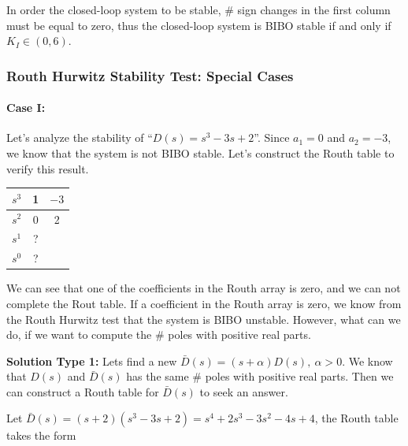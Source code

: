 \documentclass[twoside]{article}
\begin{document}
In order the closed-loop system to be stable, $\#$ sign changes in the
first column must be equal to zero, thus the closed-loop system is BIBO stable
if and only if $K_I \in (0 , 6)$.

\subsubsection{Routh Hurwitz Stability Test: Special Cases}

\paragraph{Case I:}

Let's analyze the stability of ``$D(s) = s^3 - 3 s + 2$''. 
Since $a_1 = 0$ and $a_2 = -3$, we know that the system
is not BIBO stable. Let's construct the Routh table to verify this result.

 \begin{minipage}[h]{1\linewidth}
\begin{center}
\begin{tabular}{|c || c || c  |}
\hline
$s^3$ & 1 & $-3$ 
\\ \hline
$s^2$ & 0 & 2
\\ \hline
$s^1$  & ? & 
\\ \hline
$s^0$  & ? & 
\\ \hline
\end{tabular}
\end{center}
  \end{minipage}

We can see that one of the coefficients in the Routh array is zero,
and we can not complete the Rout table. If a coefficient in the Routh
array is zero, we know from the Routh Hurwitz test that the system is
BIBO unstable. However, what can we do, if we want to compute the 
$\#$ poles with positive real parts. 

\vspace{12pt}

\textbf{Solution Type 1:} Lets find a new $\bar{D}(s) = (s + \alpha)
D(s), \ \alpha > 0$. We know that $D(s)$ and $\bar{D}(s)$ has the same 
$\#$ poles with positive real parts. Then we can construct a Routh
table for $\bar{D}(s)$ to seek an answer. 

Let $\bar{D}(s) = (s + 2) ( s^3 - 3 s + 2) = s^4 + 2 s^3 - 3 s^2 - 4 s+ 4$, the Routh table takes the form
\end{document}
